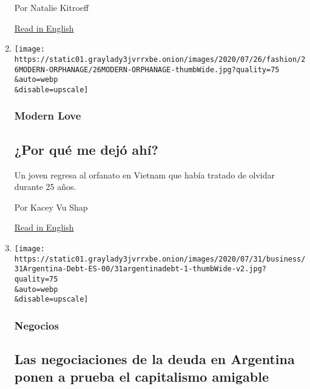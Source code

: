 \begin{enumerate}
  Por Natalie Kitroeff

  \href{https://www.nytimes3xbfgragh.onion/2020/08/02/world/americas/mexico-tv-virus-telenovela.html}{Read
  in English}
\item
  \href{/es/2020/08/02/espanol/estilos-de-vida/adopcion-orfanato.html}{}

  \texttt{[image: https://static01.graylady3jvrrxbe.onion/images/2020/07/26/fashion/26MODERN-ORPHANAGE/26MODERN-ORPHANAGE-thumbWide.jpg?quality=75\\\&auto=webp\\\&disable=upscale]}

  \hypertarget{modern-love}{%
  \subsubsection{Modern Love}\label{modern-love}}

  \hypertarget{por-quuxe9-me-dejuxf3-ahuxed}{%
  \subsection{¿Por qué me dejó
  ahí?}\label{por-quuxe9-me-dejuxf3-ahuxed}}

  Un joven regresa al orfanato en Vietnam que había tratado de olvidar
  durante 25 años.

  Por Kacey Vu Shap

  \href{https://www.nytimes3xbfgragh.onion/2020/07/24/style/modern-love-adoption-vietnam-why-did-she-leave-me-there.html}{Read
  in English}
\item
  \href{/es/2020/07/31/espanol/negocios/argentina-deuda.html}{}

  \texttt{[image: https://static01.graylady3jvrrxbe.onion/images/2020/07/31/business/31Argentina-Debt-ES-00/31argentinadebt-1-thumbWide-v2.jpg?quality=75\\\&auto=webp\\\&disable=upscale]}

  \hypertarget{negocios}{%
  \subsubsection{Negocios}\label{negocios}}

  \hypertarget{las-negociaciones-de-la-deuda-en-argentina-ponen-a-prueba-el-capitalismo-amigable}{%
  \subsection{Las negociaciones de la deuda en Argentina ponen a prueba
  el capitalismo
  amigable}\label{las-negociaciones-de-la-deuda-en-argentina-ponen-a-prueba-el-capitalismo-amigable}}


\end{enumerate}
